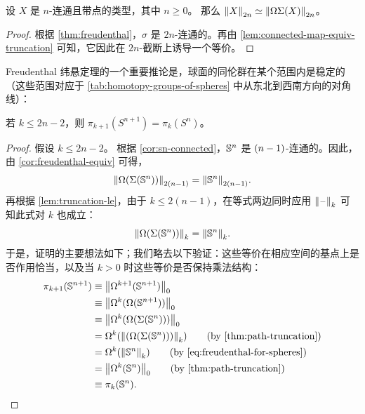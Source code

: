 
\begin{cor} \label{cor:freudenthal-equiv}
  设 $X$ 是 $n$-连通且带点的类型，其中 $n\geq 0$。
  那么 $\eqv{\trunc{2n}{X}}{\trunc{2n}{\Omega\susp(X)}}$。
\end{cor}

\begin{proof}
  根据 \cref{thm:freudenthal}，$\sigma$ 是 $2n$-连通的。再由
  \cref{lem:connected-map-equiv-truncation} 可知，它因此在 $2n$-截断上诱导一个等价。
\end{proof}

%

%
%

%
%
%
Freudenthal 纬悬定理的一个重要推论是，球面的同伦群在某个范围内是稳定的（这些范围对应于 \cref{tab:homotopy-groups-of-spheres} 中从东北到西南方向的对角线）：

\begin{cor}[球面的稳定性] \label{cor:stability-spheres}
  若 $k \le 2n-2$，则 $\pi_{k+1}(S^{n+1}) = \pi_{k}(S^{n})$。
\end{cor}

\begin{proof}
  假设 $k \le 2n-2$。
  根据 \cref{cor:sn-connected}，$\Sn ^{n}$ 是 $\nminusone$-连通的。因此，
  由 \cref{cor:freudenthal-equiv} 可得，
  \[
\trunc{2(n-1)}{\Omega(\susp(\Sn^{n}))} = \trunc{2(n-1)}{\Sn^{n}}.
\]
  再根据 \cref{lem:truncation-le}，由于 $k \le 2(n-1)$，在等式两边同时应用 $\trunc{k}{\blank}$ 可知此式对 $k$ 也成立：
  \begin{equation}\label{eq:freudenthal-for-spheres}
\trunc{k}{\Omega(\susp(\Sn^{n}))} = \trunc{k}{\Sn^{n}}.
\end{equation}
  于是，证明的主要想法如下；我们略去以下验证：这些等价在相应空间的基点上是否作用恰当，以及当 $k > 0$ 时这些等价是否保持乘法结构：
  \begin{align*}
\pi_{k+1}(\Sn^{n+1}) &\jdeq \trunc{0}{\Omega^{k+1}(\Sn^{n+1})} \\
                     &\jdeq \trunc{0}{\Omega^k(\Omega(\Sn^{n+1}))} \\
                     &\jdeq \trunc{0}{\Omega^k(\Omega(\susp(\Sn^{n})))} \\
                     &= \Omega^k(\trunc{k}{(\Omega(\susp(\Sn^{n})))})
                     \tag{by \cref{thm:path-truncation}}\\
                     &= \Omega^k(\trunc{k}{\Sn^{n}})
                     \tag{by \eqref{eq:freudenthal-for-spheres}}\\
                     &= \trunc{0}{\Omega^k(\Sn^{n})}
                     \tag{by \cref{thm:path-truncation}}\\
                     &\jdeq \pi_k(\Sn^{n}). \qedhere
\end{align*}
\end{proof}

